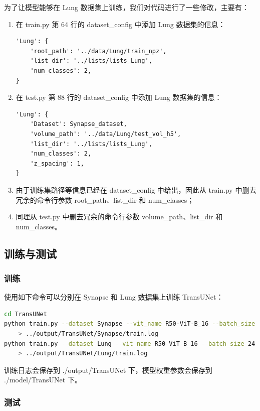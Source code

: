 \documentclass[hyperref,a4paper,UTF8]{ctexart}
\begin{document}
为了让模型能够在 Lung 数据集上训练，我们对代码进行了一些修改，主要有：

\begin{enumerate}[itemsep=2pt,topsep=0pt,parsep=0pt]
    \item 在 train.py 第 64 行的 dataset\_config 中添加 Lung 数据集的信息：
\begin{lstlisting}
'Lung': {
    'root_path': '../data/Lung/train_npz',
    'list_dir': '../lists/lists_Lung',
    'num_classes': 2,
}
\end{lstlisting}
    \item 在 test.py 第 88 行的 dataset\_config 中添加 Lung 数据集的信息：
\begin{lstlisting}
'Lung': {
    'Dataset': Synapse_dataset,
    'volume_path': '../data/Lung/test_vol_h5',
    'list_dir': '../lists/lists_Lung',
    'num_classes': 2,
    'z_spacing': 1,
}
\end{lstlisting}
    \item 由于训练集路径等信息已经在 dataset\_config 中给出，因此从 train.py 中删去冗余的命令行参数 root\_path、list\_dir 和 num\_classes；
    \item 同理从 test.py 中删去冗余的命令行参数 volume\_path、list\_dir 和 num\_classes。
\end{enumerate}

\subsection{训练与测试}

\subsubsection{训练}

使用如下命令可以分别在 Synapse 和 Lung 数据集上训练 TransUNet：

\begin{lstlisting}[language=bash]
cd TransUNet
python train.py --dataset Synapse --vit_name R50-ViT-B_16 --batch_size 22 \
    > ../output/TransUNet/Synapse/train.log
python train.py --dataset Lung --vit_name R50-ViT-B_16 --batch_size 24 \
    > ../output/TransUNet/Lung/train.log
\end{lstlisting}

训练日志会保存到 ./output/TransUNet 下，模型权重参数会保存到 ./model/TransUNet 下。

\subsubsection{测试}
\end{document}
